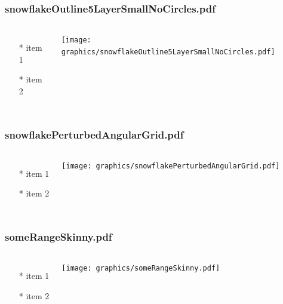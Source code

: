 \begin{frame} \frametitle{snowflakeOutline5LayerSmallNoCircles.pdf}
    \begin{columns}[c]
        \begin{itemize}
            \item[*] item 1
            \item[*] item 2
        \end{itemize}
        \begin{minipage}{\linewidth}
            \begin{center}
            \texttt{[image: graphics/snowflakeOutline5LayerSmallNoCircles.pdf]}
            \label{gfx:snowflakeOutline5LayerSmallNoCircles.pdf}
            \end{center}
        \end{minipage}
    \end{columns}
\end{frame}
\begin{frame} \frametitle{snowflakePerturbedAngularGrid.pdf}
    \begin{columns}[c]
        \begin{itemize}
            \item[*] item 1
            \item[*] item 2
        \end{itemize}
        \begin{minipage}{\linewidth}
            \begin{center}
            \texttt{[image: graphics/snowflakePerturbedAngularGrid.pdf]}
            \label{gfx:snowflakePerturbedAngularGrid.pdf}
            \end{center}
        \end{minipage}
    \end{columns}
\end{frame}
\begin{frame} \frametitle{someRangeSkinny.pdf}
    \begin{columns}[c]
        \begin{itemize}
            \item[*] item 1
            \item[*] item 2
        \end{itemize}
        \begin{minipage}{\linewidth}
            \begin{center}
            \texttt{[image: graphics/someRangeSkinny.pdf]}
            \label{gfx:someRangeSkinny.pdf}
            \end{center}
        \end{minipage}
    \end{columns}
\end{frame}
